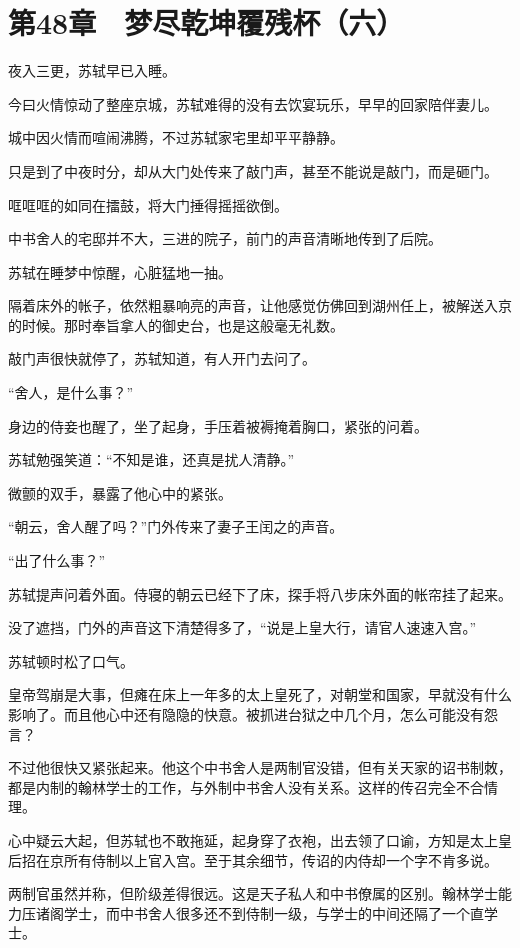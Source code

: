 \section{第48章　梦尽乾坤覆残杯（六）}

夜入三更，苏轼早已入睡。

今曰火情惊动了整座京城，苏轼难得的没有去饮宴玩乐，早早的回家陪伴妻儿。

城中因火情而喧闹沸腾，不过苏轼家宅里却平平静静。

只是到了中夜时分，却从大门处传来了敲门声，甚至不能说是敲门，而是砸门。

哐哐哐的如同在擂鼓，将大门捶得摇摇欲倒。

中书舍人的宅邸并不大，三进的院子，前门的声音清晰地传到了后院。

苏轼在睡梦中惊醒，心脏猛地一抽。

隔着床外的帐子，依然粗暴响亮的声音，让他感觉仿佛回到湖州任上，被解送入京的时候。那时奉旨拿人的御史台，也是这般毫无礼数。

敲门声很快就停了，苏轼知道，有人开门去问了。

“舍人，是什么事？”

身边的侍妾也醒了，坐了起身，手压着被褥掩着胸口，紧张的问着。

苏轼勉强笑道：“不知是谁，还真是扰人清静。”

微颤的双手，暴露了他心中的紧张。

“朝云，舍人醒了吗？”门外传来了妻子王闰之的声音。

“出了什么事？”

苏轼提声问着外面。侍寝的朝云已经下了床，探手将八步床外面的帐帘挂了起来。

没了遮挡，门外的声音这下清楚得多了，“说是上皇大行，请官人速速入宫。”

苏轼顿时松了口气。

皇帝驾崩是大事，但瘫在床上一年多的太上皇死了，对朝堂和国家，早就没有什么影响了。而且他心中还有隐隐的快意。被抓进台狱之中几个月，怎么可能没有怨言？

不过他很快又紧张起来。他这个中书舍人是两制官没错，但有关天家的诏书制敇，都是内制的翰林学士的工作，与外制中书舍人没有关系。这样的传召完全不合情理。

心中疑云大起，但苏轼也不敢拖延，起身穿了衣袍，出去领了口谕，方知是太上皇后招在京所有侍制以上官入宫。至于其余细节，传诏的内侍却一个字不肯多说。

两制官虽然并称，但阶级差得很远。这是天子私人和中书僚属的区别。翰林学士能力压诸阁学士，而中书舍人很多还不到侍制一级，与学士的中间还隔了一个直学士。

